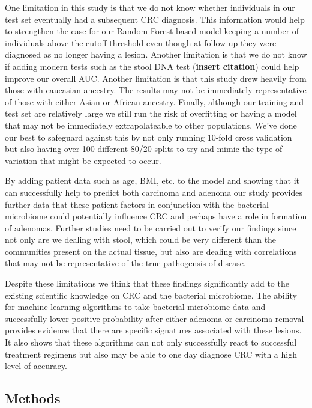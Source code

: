 \documentclass[12pt,]{article}
\begin{document}
One limitation in this study is that we do not know whether individuals
in our test set eventually had a subsequent CRC diagnosis. This
information would help to strengthen the case for our Random Forest
based model keeping a number of individuals above the cutoff threshold
even though at follow up they were diagnosed as no longer having a
lesion. Another limitation is that we do not know if adding modern tests
such as the stool DNA test (\textbf{insert citation}) could help improve
our overall AUC. Another limitation is that this study drew heavily from
those with caucasian ancestry. The results may not be immediately
representative of those with either Asian or African ancestry. Finally,
although our training and test set are relatively large we still run the
risk of overfitting or having a model that may not be immediately
extrapolateable to other populations. We've done our best to safeguard
against this by not only running 10-fold cross validation but also
having over 100 different 80/20 splits to try and mimic the type of
variation that might be expected to occur.

By adding patient data such as age, BMI, etc. to the model and showing
that it can successfully help to predict both carcinoma and adenoma our
study provides further data that these patient factors in conjunction
with the bacterial microbiome could potentially influence CRC and
perhaps have a role in formation of adenomas. Further studies need to be
carried out to verify our findings since not only are we dealing with
stool, which could be very different than the communities present on the
actual tissue, but also are dealing with correlations that may not be
representative of the true pathogensis of disease.

Despite these limitations we think that these findings significantly add
to the existing scientific knowledge on CRC and the bacterial
microbiome. The ability for machine learning algorithms to take
bacterial microbiome data and successfully lower positive probability
after either adenoma or carcinoma removal provides evidence that there
are specific signatures associated with these lesions. It also shows
that these algorithms can not only successfully react to successful
treatment regimens but also may be able to one day diagnose CRC with a
high level of accuracy.

\newpage

\subsection{Methods}\label{methods}
\end{document}
